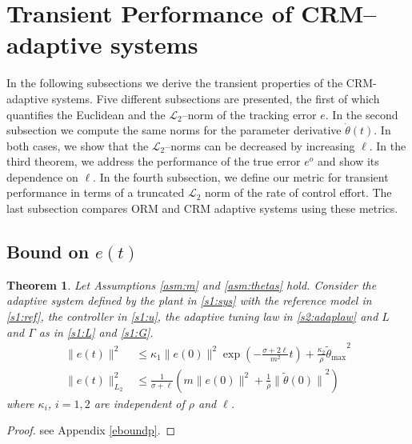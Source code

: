 \documentclass[10pt,journal]{IEEEtran}
\theoremstyle{plain}%
\newtheorem{thm}{Theorem}%
\theoremstyle{definition}
\newcommand{\be}[0]{\begin{equation}}
\newcommand{\ee}[0]{\end{equation}}
\newcommand{\norms}[1]{\lVert#1\rVert}
\newcommand{\normB}[0]{\norms}
\let\norm=\normB
\newcommand{\norml}[2]{\norm{#1}_{L_{#2}}}
\begin{document}
\section{Transient Performance of CRM--adaptive systems}\label{section:perf}

In the following subsections we derive the transient properties of the CRM-adaptive systems. Five different subsections are presented, the first of which quantifies the Euclidean and the $\mathcal L_2$--norm of the tracking error $e$. In the second subsection we compute the same norms for the parameter derivative $\dot\theta(t)$. In both cases, we show that the $\mathcal L_2$--norms can be decreased by increasing $\ell$. In the third theorem, we address the performance of the true error $e^o$ and show its dependence on $\ell$. In the fourth subsection, we define our metric for transient performance in terms of a truncated $\mathcal L_2$ norm of the rate of control effort. The last subsection compares ORM and CRM adaptive systems using these metrics.
%


\subsection{Bound on $e(t)$}
\begin{thm} \label{ebound}Let Assumptions \ref{asm:m} and \ref{asm:thetas} hold. Consider the adaptive system defined by the plant in \eqref{s1:sys} with the reference model in \eqref{s1:ref}, the controller in \eqref{s1:u}, the adaptive tuning law in \eqref{s2:adaplaw} and $L$ and $\Gamma$ as in \eqref{s1:L} and \eqref{s1:G}.
\begin{align}
\label{e2e}\norm {e(t)}^2 &\leq  \kappa_1 \norm{e(0)}^2 \exp \left(-\frac{\sigma+2\ell}{m^2} t \right) + \frac{\kappa_2}{\rho} {\tilde\theta_\text{max}}^2\\
\label{el2}\norml{e(t)}{2}^2 &\leq \frac{1}{\sigma+ \ell} \left(m \norm{e(0)}^2 +  \frac {1} {\rho}{\norm{\tilde\theta(0)}}^2 \right)
\end{align} where $\kappa_i$, $i=1,2$ are independent of $\rho$ and $\ell$.\end{thm}
\begin{proof}
see Appendix \ref{eboundp}.\end{proof}
\end{document}
